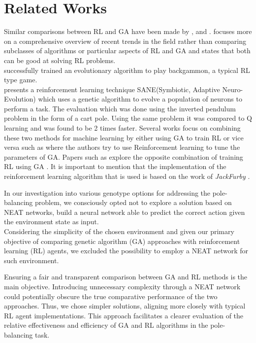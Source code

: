 \section{Related Works}

Similar comparisons between RL and GA have been made by \cite{drugan2019reinforcement},\cite{taylor2006comparing} and \cite{pollack1997coevolution}. \cite{drugan2019reinforcement}  focuses more on a comprehensive overview of recent trends in the field rather than comparing subclasses of algorithms or particular aspects of RL and GA and states that both can be good at solving RL problems.\\ \cite{pollack1997coevolution} successfully trained an evolutionary algorithm to play backgammon, a typical RL type game.\\
\cite{moriarty1996efficient} presents a reinforcement learning technique SANE(Symbiotic, Adaptive Neuro-Evolution) which uses a genetic algorithm to evolve a population of neurons to perform a task. The evaluation which was done using the inverted pendulum problem in the form of a cart pole. Using the same problem it was compared to Q learning and was found to be 2 times faster. Several works focus on combining these two methods for machine learning by either using GA to train RL or vice versa such as \cite{eiben2007reinforcement} where the authors try to use Reinforcement learning to tune the parameters of GA.  Papers such as  \cite{khadka2018evolutionary} explore the opposite combination of training RL using GA . It is important to mention that the implementation of the reinforcement learning algorithm that is used is based on the work of \textit{JackFurby} \cite{JackFurbyCartPole}. 

In our investigation into various genotype options for addressing the pole-balancing problem, we consciously opted not to explore a solution based on NEAT\cite{stanley2002NEAT} networks, build a neural network able to predict the correct action given the environment state as input.\\
Considering the simplicity of the chosen environment and given our primary objective of comparing genetic algorithm (GA) approaches with reinforcement learning (RL) agents, we excluded the possibility to employ a NEAT network for such environment.

Ensuring a fair and transparent comparison between GA and RL methods is the main objective. Introducing unnecessary complexity through a NEAT network could potentially obscure the true comparative performance of the two approaches. Thus, we chose simpler solutions, aligning more closely with typical RL agent implementations. This approach facilitates a clearer evaluation of the relative effectiveness and efficiency of GA and RL algorithms in the pole-balancing task.